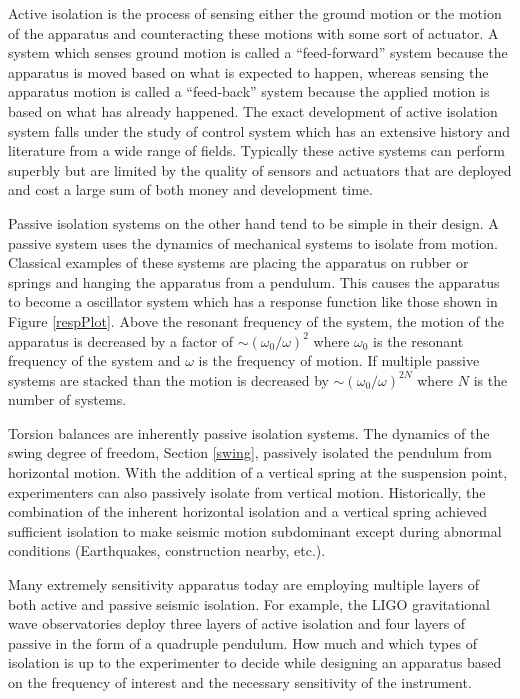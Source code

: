 \documentclass{book}
\begin{document}
Active isolation is the process of sensing either the ground motion or the motion of the apparatus and counteracting these motions with some sort of actuator. A system which senses ground motion is called a ``feed-forward'' system because the apparatus is moved based on what is expected to happen, whereas sensing the apparatus motion is called a ``feed-back'' system because the applied motion is based on what has already happened. The exact development of active isolation system falls under the study of control system which has an extensive history and literature from a wide range of fields. Typically these active systems can perform superbly but are limited by the quality of sensors and actuators that are deployed and cost a large sum of both money and development time. 

Passive isolation systems on the other hand tend to be simple in their design. A passive system uses the dynamics of mechanical systems to isolate from motion. Classical examples of these systems are placing the apparatus on rubber or springs and hanging the apparatus from a pendulum. This causes the apparatus to become a oscillator system which has a response function like those shown in Figure \ref{respPlot}. Above the resonant frequency of the system, the motion of the apparatus is decreased by a factor of $\sim (\omega_0/\omega)^2$ where $\omega_0$ is the resonant frequency of the system and $\omega$ is the frequency of motion. If multiple passive systems are stacked than the motion is decreased by $\sim (\omega_0/\omega)^{2N}$ where $N$ is the number of systems.

Torsion balances are inherently passive isolation systems. The dynamics of the swing degree of freedom, Section \ref{swing}, passively isolated the pendulum from horizontal motion. With the addition of a vertical spring at the suspension point, experimenters can also passively isolate from vertical motion. Historically, the combination of the inherent horizontal isolation and a vertical spring achieved sufficient isolation to make seismic motion subdominant except during abnormal conditions (Earthquakes, construction nearby, etc.). 

Many extremely sensitivity apparatus today are employing multiple layers of both active and passive seismic isolation. For example, the LIGO gravitational wave observatories deploy three layers of active isolation and four layers of passive in the form of a quadruple pendulum. How much and which types of isolation is up to the experimenter to decide while designing an apparatus based on the frequency of interest and the necessary sensitivity of the instrument.
\end{document}
